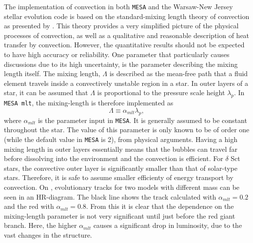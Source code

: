 The implementation of convection in both \texttt{MESA} and the Warsaw-New Jersey stellar evolution code is based on the standard-mixing length theory of convection as presented by \citet{weiss2004cox}. This theory provides a very simplified picture of the physical processes of convection, as well as a qualitative and reasonable description of heat transfer by convection. However, the quantitative results should not be expected to have high accuracy or reliability. One parameter that particularly causes discussions due to its high uncertainty, is the parameter describing the mixing length itself. The mixing length, $\Lambda$ is described as the mean-free path that a fluid element travels inside a convectively unstable region in a star. In outer layers of a star, it can be assumed that $\Lambda$ is proportional to the pressure scale height $\lambda_p$. In \texttt{MESA mlt}, the mixing-length is therefore implemented as
%
\begin{equation}
    \Lambda \equiv \alpha_{mlt} \lambda_p,
\end{equation}
%
where $\alpha_{mlt}$ is the parameter input in \texttt{MESA}. It is generally assumed to be constant throughout the star. The value of this parameter is only known to be of order one (while the default value in \texttt{MESA} is 2), from physical arguments. Having a high mixing length in outer layers essentially means that the bubbles can travel far before dissolving into the environment and the convection is efficient. For $\delta$ Sct stars, the convective outer layer is significantly smaller than that of solar-type stars. Therefore, it is safe to assume smaller efficienty of energy transport by convection. On , evolutionary tracks for two models with different mass can be seen in an HR-diagram. The black line shows the track calculated with  $\alpha_{mlt}= 0.2$ and the red with $\alpha_{mlt}= 0.8$. From this it is clear that the dependence on the mixing-length parameter is not very significant until just before the red giant branch. Here, the higher $\alpha_{mlt}$ causes a significant drop in luminosity, due to the vast changes in the structure. %


